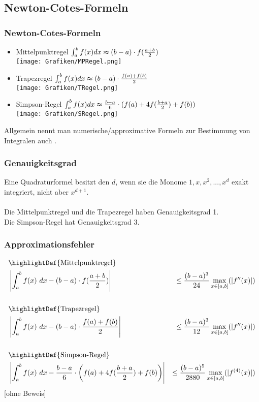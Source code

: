 \subsection{Newton-Cotes-Formeln}
%
\begin{frame}\frametitle{Newton-Cotes-Formeln}
\begin{itemize}
\item Mittelpunktregel  $\int_a^b f(x)dx \thickapprox (b-a)\cdot f(\frac{a+b}{2})$\\\texttt{[image: Grafiken/MPRegel.png]} \pause
\item Trapezregel $\int_a^b f(x)dx \thickapprox (b-a) \cdot \frac{f(a)+f(b)}{2}$\\\texttt{[image: Grafiken/TRegel.png]} \pause 
\item Simpson-Regel $\int_a^b f(x)dx \thickapprox \frac{b-a}{6}\cdot (f(a)+4f(\frac{b+a}{2})+f(b))$\\\texttt{[image: Grafiken/SRegel.png]}
\end{itemize}
Allgemein nennt man numerische/approximative Formeln zur Bestimmung von Integralen auch .
\end{frame}
%
\begin{frame}\frametitle{Genauigkeitsgrad}
Eine Quadraturformel besitzt den  $d$, wenn sie die Monome $1,x,x^2,...,x^d$ exakt integriert, nicht aber $x^{d+1}$.\\\pause
\vfill
{}\\
Die Mittelpunktregel und die Trapezregel haben Genauigkeitsgrad 1.\\
Die Simpson-Regel hat Genauigkeitsgrad 3.
\end{frame}
%
%
\begin{frame}\frametitle{Approximationsfehler}
\footnotesize
\begin{align*}
&\text{\highlightDef{Mittelpunktregel}}\\
&\left|\int_a^b f(x)\ dx - (b-a)\cdot f(\frac{a+b}{2}) \right|&\le \frac{(b-a)^3}{24}\max_{x\in[a,b]}(|f''(x)|)\\
%
&&\\
&\text{\highlightDef{Trapezregel}}\\
&\left|\int_a^b f(x)\ dx - (b-a) \cdot \frac{f(a)+f(b)}{2}  \right|&\le \frac{(b-a)^3}{12}\max_{x\in[a,b]}(|f''(x)|)\\
%
&&\\
&\text{\highlightDef{Simpson-Regel}}\\
&\left|\int_a^b f(x)\ dx -  \frac{b-a}{6}\cdot \left(f(a)+4f(\frac{b+a}{2})+f(b)\right)\right|&\le \frac{(b-a)^5}{2880}\max_{x\in[a,b]}(|f^{(4)}(x)|)
\end{align*}
\vfill
[ohne Beweis]
\end{frame}
%
